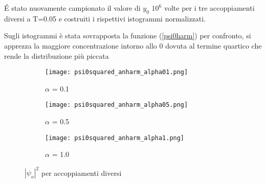 \documentclass{article}
\begin{document}
\'E stato nuovamente campionato il valore di $y_0$ $10^6$ volte per i tre accoppiamenti diversi a T=0.05 e costruiti i rispettivi istogrammi normalizzati. 

Sugli istogrammi è stata sovrapposta la funzione (\ref{psi0harm}) per confronto, si apprezza la maggiore concentrazione intorno allo 0 dovuta al termine quartico che rende la distribuzione più piccata

\begin{figure}[h]
     \centering
     \begin{subfigure}[b]{0.48\textwidth}
         \centering
         \texttt{[image: psi0squared\_anharm\_alpha01.png]}
         \caption{$\alpha$ = 0.1}
         \label{fig:psi0alpha01}
     \end{subfigure}
     \hfill
     \begin{subfigure}[b]{0.48\textwidth}
         \centering
         \texttt{[image: psi0squared\_anharm\_alpha05.png]}
         \caption{$\alpha$ = 0.5}
         \label{fig:psi0alpha05}
     \end{subfigure}
     \hfill
     \begin{subfigure}[b]{0.48\textwidth}
         \centering
         \texttt{[image: psi0squared\_anharm\_alpha1.png]}
         \caption{$\alpha$ = 1.0}
         \label{fig:psi0alpha1}
     \end{subfigure}
     \hfill
        \caption{$|\psi_o|^2$ per accoppiamenti diversi}
        \label{fig:psi0anarm}
\end{figure}
\end{document}
